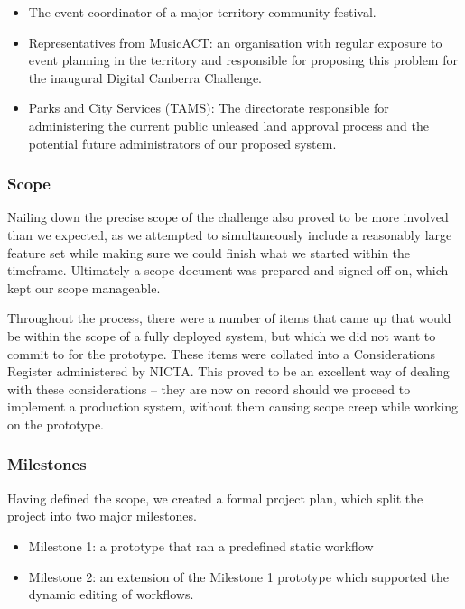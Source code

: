 \documentclass[12pt,a4paper,twosided]{article}
\begin{document}
\begin{itemize}

\item
  The event coordinator of a major territory community festival.
\item
  Representatives from MusicACT: an organisation with regular exposure 
  to event planning in the territory and responsible for proposing 
  this problem for the inaugural Digital Canberra Challenge.
\item
  Parks and City Services (TAMS): The directorate responsible for
  administering the current public unleased land approval process and the
  potential future administrators of our proposed system.
\end{itemize}

\subsubsection{Scope}

Nailing down the precise scope of the challenge also proved to be more
involved than we expected, as we attempted to simultaneously include a
reasonably large feature set while making sure we could finish what we
started within the timeframe. Ultimately a scope document was prepared
and signed off on, which kept our scope manageable.

Throughout the process, there were a number of items that came up that
would be within the scope of a fully deployed system, but which we did
not want to commit to for the prototype. These items were collated into
a Considerations Register administered by NICTA. This proved to be an
excellent way of dealing with these considerations -- they are now on
record should we proceed to implement a production system, without them
causing scope creep while working on the prototype.

\subsubsection{Milestones}

Having defined the scope, we created a formal project plan, which split
the project into two major milestones.

\begin{itemize}

\item
  Milestone 1: a prototype that ran a predefined static workflow
\item
  Milestone 2: an extension of the Milestone 1 prototype which supported
  the dynamic editing of workflows.
\end{itemize}
\end{document}
